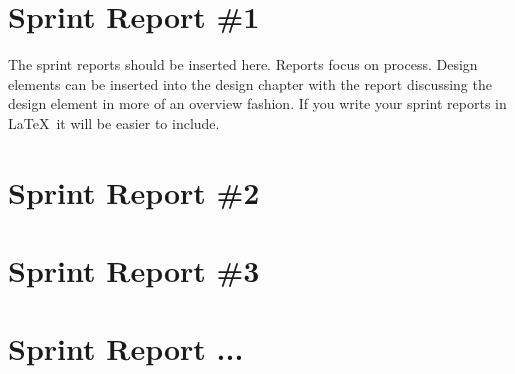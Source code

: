

\section{Sprint Report \#1}
The sprint reports should be inserted here.     Reports focus on process.  Design elements can be inserted into the design chapter with the report discussing the design element in more of an overview fashion.   If you write your sprint reports in \LaTeX\ it will be easier to include.  

\section{Sprint Report \#2}

\section{Sprint Report \#3}

\section{Sprint Report ...}
